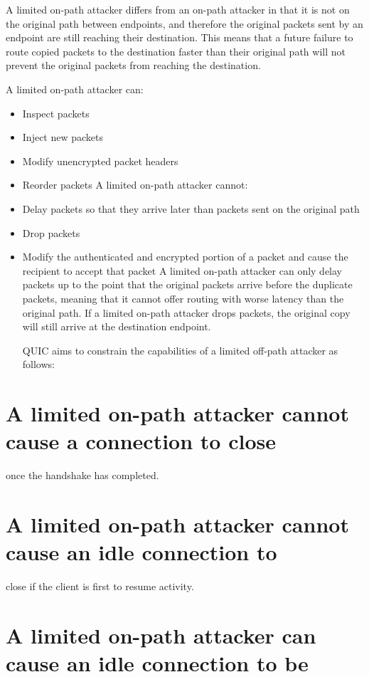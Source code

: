 \documentclass{article}
\begin{document}
A limited on-path attacker differs from an on-path attacker in that it is not on the original path between endpoints, and therefore the original packets sent by an endpoint are still reaching their destination.  This means that a future failure to route copied packets to the destination faster than their original path will not prevent the original packets from reaching the destination.

A limited on-path attacker can:

\begin{itemize}
\item Inspect packets
\item Inject new packets
\item Modify unencrypted packet headers
\item Reorder packets
A limited on-path attacker cannot:

\item Delay packets so that they arrive later than packets sent on the original path
\item Drop packets
\item Modify the authenticated and encrypted portion of a packet and cause the recipient to accept that packet
A limited on-path attacker can only delay packets up to the point that the original packets arrive before the duplicate packets, meaning that it cannot offer routing with worse latency than the original path.  If a limited on-path attacker drops packets, the original copy will still arrive at the destination endpoint.

QUIC aims to constrain the capabilities of a limited off-path attacker as follows:

\end{itemize}
\section{A limited on-path attacker cannot cause a connection to close}

once the handshake has completed.

\section{A limited on-path attacker cannot cause an idle connection to}

close if the client is first to resume activity.

\section{A limited on-path attacker can cause an idle connection to be}
\end{document}
